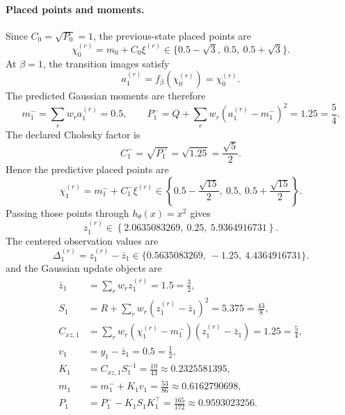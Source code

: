 \paragraph{Placed points and moments.}
Since \(C_0=\sqrt{P_0}=1\), the previous-state placed points are
\begin{equation}
  \chi_0^{(r)}=m_0+C_0\xi^{(r)}
  \in
  \{0.5-\sqrt3,\ 0.5,\ 0.5+\sqrt3\}.
  \label{eq:bf-hd-sgqf-example-prev-points}
\end{equation}
At \(\beta=1\), the transition images satisfy
\begin{equation}
  a_1^{(r)}=f_\beta(\chi_0^{(r)})=\chi_0^{(r)}.
  \label{eq:bf-hd-sgqf-example-transition-images}
\end{equation}
The predicted Gaussian moments are therefore
\begin{equation}
  m_1^-=
  \sum_rw_ra_1^{(r)}=0.5,
  \qquad
  P_1^-=Q+\sum_rw_r(a_1^{(r)}-m_1^-)^2=1.25=\frac54.
  \label{eq:bf-hd-sgqf-example-pred-moments}
\end{equation}
The declared Cholesky factor is
\begin{equation}
  C_1^- = \sqrt{P_1^-}=\sqrt{1.25}=\frac{\sqrt5}{2}.
  \label{eq:bf-hd-sgqf-example-pred-factor}
\end{equation}
Hence the predictive placed points are
\begin{equation}
  \chi_1^{(r)}=m_1^-+C_1^-\xi^{(r)}
  \in
  \left\{0.5-\frac{\sqrt{15}}{2},\ 0.5,\ 0.5+\frac{\sqrt{15}}{2}\right\}.
  \label{eq:bf-hd-sgqf-example-pred-points}
\end{equation}
Passing those points through \(h_\theta(x)=x^2\) gives
\begin{equation}
  z_1^{(r)}
  \in
  \left\{2.0635083269,\ 0.25,\ 5.9364916731\right\}.
  \label{eq:bf-hd-sgqf-example-z-values}
\end{equation}
The centered observation values are
\begin{equation}
  \Delta_1^{(r)}=z_1^{(r)}-\bar z_1
  \in
  \{0.5635083269,\ -1.25,\ 4.4364916731\}.
  \label{eq:bf-hd-sgqf-example-Delta}
\end{equation}
and the Gaussian update objects are
\begin{align}
  \bar z_1&=\sum_rw_r z_1^{(r)}=1.5=\frac32,
  \label{eq:bf-hd-sgqf-example-zbar}\\
  S_1&=R+\sum_rw_r(z_1^{(r)}-\bar z_1)^2=5.375=\frac{43}{8},
  \label{eq:bf-hd-sgqf-example-S}\\
  C_{xz,1}&=\sum_rw_r(\chi_1^{(r)}-m_1^-)(z_1^{(r)}-\bar z_1)=1.25=\frac54,
  \label{eq:bf-hd-sgqf-example-Cxz}\\
  v_1&=y_1-\bar z_1=0.5=\frac12,
  \label{eq:bf-hd-sgqf-example-v}\\
  K_1&=C_{xz,1}S_1^{-1}=\frac{10}{43}\approx0.2325581395,
  \label{eq:bf-hd-sgqf-example-K}\\
  m_1&=m_1^-+K_1v_1=\frac{53}{86}\approx0.6162790698,
  \label{eq:bf-hd-sgqf-example-m}\\
  P_1&=P_1^- -K_1S_1K_1^\top=\frac{165}{172}\approx0.9593023256.
  \label{eq:bf-hd-sgqf-example-P}
\end{align}
